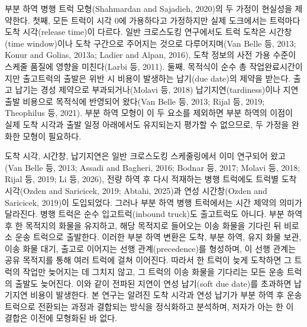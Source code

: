 \documentclass[10pt,a4paper]{article}
\begin{document}
부분 하역 병행 트럭 모형(Shahmardan and Sajadieh, 2020)의 두 가정이 현실성을 제약한다. 첫째, 모든 트럭이 시각 0에 가용하다고 가정하지만
실제 도크에서는 트럭마다 도착 시각(release time)이 다르다. 일반 크로스도킹 연구에서도 트럭 도착은
시간창(time window)이나 도착 구간으로 주어지는 것으로 다루어지며(Van Belle 등, 2013; Konur and Golias, 2013a;
Ladier and Alpan, 2016), 도착 정보의 사전 가용 수준이 스케줄 품질에 영향을 미친다(Larbi 등, 2011). 둘째,
목적식이 순수 총 작업완료시간이지만 출고트럭의 출발은 위반 시 비용이 발생하는 납기(due date)의 제약을 받는다.
출고 납기는 경성 제약으로 부과되거나(Molavi 등, 2018) 납기지연(tardiness)이나 지연 출발 비용으로 목적식에
반영되어 왔다(Van Belle 등, 2013; Rijal 등, 2019; Theophilus 등, 2021). 부분 하역 모형이 이 두 요소를 제외하면
부분 하역의 이점이 실제 도착 시각과 출발 일정 아래에서도 유지되는지 평가할 수 없으므로, 두 가정을 완화한 모형이 필요하다.

도착 시각, 시간창, 납기지연은 일반 크로스도킹 스케줄링에서 이미
연구되어 왔고(Van Belle 등, 2013; Assadi and Bagheri, 2016; Bodnar 등, 2017; Molavi 등, 2018; Rijal 등, 2019; Li 등, 2026),
전량 하역 후 다시 적재하는 병행 트럭에도 트럭별 도착 시각(Ozden and Saricicek, 2019; Abtahi, 2025)과
연성 시간창(Ozden and Saricicek, 2019)이 도입되었다.
그러나 부분 하역 병행 트럭에서는 시간 제약의 의미가 달라진다. 병행 트럭은
순수 입고트럭(inbound truck)도 출고트럭도 아니다. 부분 하역 후 한 목적지의 화물을 유지하고, 해당
목적지로 들어오는 이송 화물을 기다린 뒤 비로소 운송 트럭으로 출발한다. 이러한 부분 하역 변환은 도착, 부분 하역, 유지 화물 보관, 이송 화물 대기, 출고로 이어지는 선행 관계(precedence)를 형성하며, 이 선행 관계는 공유 목적지를 통해 여러 트럭에 걸쳐 이어진다. 따라서 한 트럭이 늦게 도착하면 그 트럭의 작업만 늦어지는 데 그치지 않고, 그 트럭의 이송 화물을 기다리는 모든 운송 트럭의 출발도 늦어진다. 이와 같이 전파된 지연이 연성 납기(soft due date)를 초과하면 납기지연 비용이 발생한다. 본 연구는 알려진 도착 시각과 연성 납기가 부분 하역 후 운송 트럭으로 전환되는 과정과 결합되는 방식을 정식화하고 분석하며, 저자가 아는 한 이 결합은 이전에 모형화된 바 없다.
\end{document}
